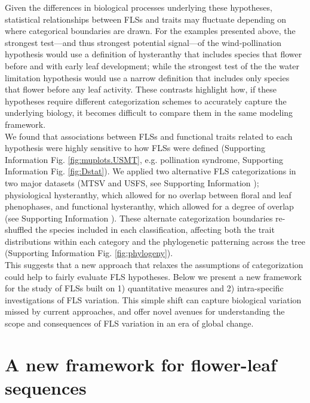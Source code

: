 \documentclass[11pt]{article}
\begin{document}
\noindent Given the differences in biological processes underlying these hypotheses, statistical relationships between FLSs and traits may fluctuate depending on where categorical boundaries are drawn. For the examples presented above, the strongest test---and thus strongest potential signal---of the wind-pollination hypothesis would use a definition of hysteranthy that includes species that flower before and with early leaf development; while the strongest test of the the water limitation  hypothesis would use a narrow definition that includes only species that flower before any leaf activity. These contrasts highlight how, if these hypotheses require different categorization schemes to accurately capture the underlying biology, it becomes difficult to compare them in the same modeling framework.\\ 

\noindent We found that associations between FLSs and functional traits related to each hypothesis were highly sensitive to how FLSs were defined (Supporting Information Fig. \ref{fig:muplots.USMT}, e.g. pollination syndrome, Supporting Information Fig. \ref{fig:Dstat}). We applied two alternative FLS categorizations in two major datasets (MTSV and USFS, see Supporting Information ); physiological hysteranthy, which allowed for no overlap between floral and leaf phenophases, and functional hysteranthy, which allowed for a degree of overlap (see Supporting Information ). These alternate categorization boundaries re-shuffled the species included in each classification, affecting both the trait distributions within each category and the phylogenetic patterning across the tree (Supporting Information Fig. \ref{fig:phylogeny}).\\ 
 
\noindent This suggests that a new approach that relaxes the assumptions of categorization could help to fairly evaluate FLS hypotheses. Below we present a new framework for the study of FLSs built on 1) quantitative measures and 2) intra-specific investigations of FLS variation. This simple shift can capture biological variation missed by current approaches, and offer novel avenues for understanding the scope and consequences of FLS variation in an era of global change.

 
\section*{A new framework for flower-leaf sequences} 
\end{document}
